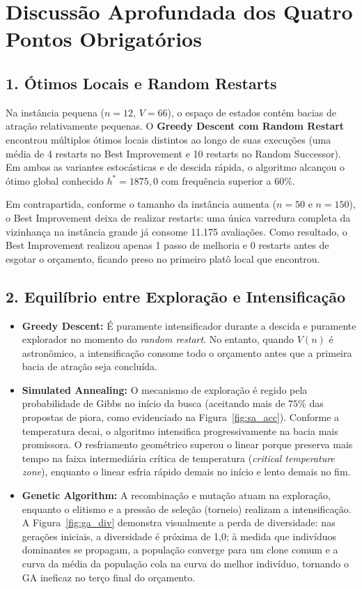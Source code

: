 \documentclass[11pt,a4paper]{article}
\begin{document}
\section{Discussão Aprofundada dos Quatro Pontos Obrigatórios}

\subsection{1. Ótimos Locais e Random Restarts}
Na instância pequena ($n=12$, $V=66$), o espaço de estados contém bacias de atração relativamente pequenas. O \textbf{Greedy Descent com Random Restart} encontrou múltiplos ótimos locais distintos ao longo de suas execuções (uma média de 4 restarts no Best Improvement e 10 restarts no Random Successor). Em ambas as variantes estocásticas e de descida rápida, o algoritmo alcançou o ótimo global conhecido $h^* = 1875{,}0$ com frequência superior a $60\%$. 

Em contrapartida, conforme o tamanho da instância aumenta ($n=50$ e $n=150$), o Best Improvement deixa de realizar restarts: uma única varredura completa da vizinhança na instância grande já consome 11.175 avaliações. Como resultado, o Best Improvement realizou apenas 1 passo de melhoria e 0 restarts antes de esgotar o orçamento, ficando preso no primeiro platô local que encontrou.

\subsection{2. Equilíbrio entre Exploração e Intensificação}
\begin{itemize}
    \item \textbf{Greedy Descent:} É puramente intensificador durante a descida e puramente explorador no momento do \emph{random restart}. No entanto, quando $V(n)$ é astronômico, a intensificação consome todo o orçamento antes que a primeira bacia de atração seja concluída.
    \item \textbf{Simulated Annealing:} O mecanismo de exploração é regido pela probabilidade de Gibbs no início da busca (aceitando mais de $75\%$ das propostas de piora, como evidenciado na Figura~\ref{fig:sa_acc}). Conforme a temperatura decai, o algoritmo intensifica progressivamente na bacia mais promissora. O resfriamento geométrico superou o linear porque preserva mais tempo na faixa intermediária crítica de temperatura (\emph{critical temperature zone}), enquanto o linear esfria rápido demais no início e lento demais no fim.
    \item \textbf{Genetic Algorithm:} A recombinação e mutação atuam na exploração, enquanto o elitismo e a pressão de seleção (torneio) realizam a intensificação. A Figura~\ref{fig:ga_div} demonstra visualmente a perda de diversidade: nas gerações iniciais, a diversidade é próxima de 1{,}0; à medida que indivíduos dominantes se propagam, a população converge para um clone comum e a curva da média da população cola na curva do melhor indivíduo, tornando o GA ineficaz no terço final do orçamento.
\end{itemize}
\end{document}
